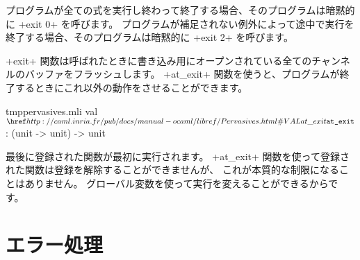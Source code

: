 プログラムが全ての式を実行し終わって終了する場合、そのプログラムは暗黙的に \ml+exit 0+ を呼びます。
プログラムが補足されない例外によって途中で実行を終了する場合、そのプログラムは暗黙的に \ml+exit 2+ を呼びます。

\ml+exit+ 関数は呼ばれたときに書き込み用にオープンされている全てのチャンネルのバッファをフラッシュします。
\ml+at_exit+ 関数を使うと、プログラムが終了するときにこれ以外の動作をさせることができます。
%
\begin{listingcodefile}{tmppervasives.mli}
val $\indexlibvalue{Pervasives}{at\_exit}$ : (unit -> unit) -> unit
\end{listingcodefile}
%
最後に登録された関数が最初に実行されます。
\ml+at_exit+ 関数を使って登録された関数は登録を解除することができませんが、
これが本質的な制限になることはありません。
グローバル変数を使って実行を変えることができるからです。

\section{エラー処理}

